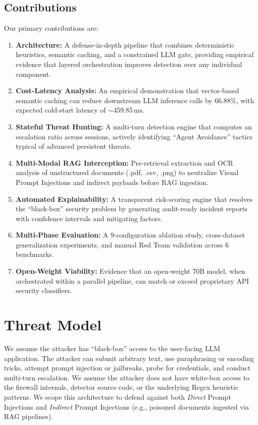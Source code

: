 \documentclass[conference]{IEEEtran}
\begin{document}
\subsection{Contributions}
Our primary contributions are:
\begin{enumerate}
    \item \textbf{Architecture:} A defense-in-depth pipeline that combines deterministic heuristics, semantic caching, and a constrained LLM gate, providing empirical evidence that layered orchestration improves detection over any individual component.
    \item \textbf{Cost-Latency Analysis:} An empirical demonstration that vector-based semantic caching can reduce downstream LLM inference calls by 66.88\%, with expected cold-start latency of $\sim$459.85\,ms.
    \item \textbf{Stateful Threat Hunting:} A multi-turn detection engine that computes an escalation ratio across sessions, actively identifying ``Agent Avoidance'' tactics typical of advanced persistent threats.
    \item \textbf{Multi-Modal RAG Interception:} Pre-retrieval extraction and OCR analysis of unstructured documents (.pdf, .csv, .png) to neutralize Visual Prompt Injections and indirect payloads before RAG ingestion.
    \item \textbf{Automated Explainability:} A transparent risk-scoring engine that resolves the ``black-box'' security problem by generating audit-ready incident reports with confidence intervals and mitigating factors.
    \item \textbf{Multi-Phase Evaluation:} A 9-configuration ablation study, cross-dataset generalization experiments, and manual Red Team validation across 6 benchmarks.
    \item \textbf{Open-Weight Viability:} Evidence that an open-weight 70B model, when orchestrated within a parallel pipeline, can match or exceed proprietary API security classifiers.
\end{enumerate}

\section{Threat Model}
We assume the attacker has ``black-box'' access to the user-facing LLM application. The attacker can submit arbitrary text, use paraphrasing or encoding tricks, attempt prompt injection or jailbreaks, probe for credentials, and conduct multi-turn escalation. We assume the attacker does not have white-box access to the firewall internals, detector source code, or the underlying Regex heuristic patterns. We scope this architecture to defend against both \textit{Direct} Prompt Injections and \textit{Indirect} Prompt Injections (e.g., poisoned documents ingested via RAG pipelines).
\end{document}
